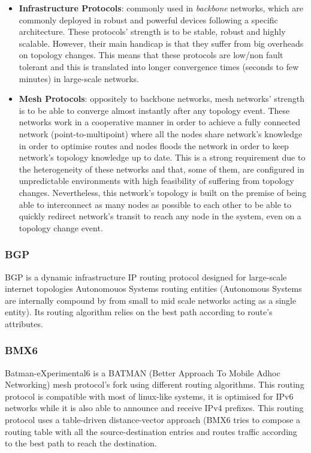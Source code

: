 \begin{itemize}
    \item \textbf{Infrastructure Protocols}: commonly used in \textit{backbone} networks, which are commonly deployed in robust and powerful devices following a specific architecture. These protocols' strength is to be stable, robust and highly scalable. However, their main handicap is that they suffer from big overheads on topology changes. This means that these protocols are low/non fault tolerant and this is translated into longer convergence times (seconds to few minutes) in large-scale networks.

    \item \textbf{Mesh Protocols}: oppositely to backbone networks, mesh networks' strength is to be able to converge almost instantly after any topology event. These networks work in a cooperative manner in order to achieve a fully connected network (point-to-multipoint) where all the nodes share network's knowledge in order to optimise routes and nodes floods the network in order to keep network's topology knowledge up to date. This is a strong requirement due to the heterogeneity of these networks and that, some of them, are configured in unpredictable environments with high feasibility of suffering from topology changes. Nevertheless, this network's topology is built on the premise of being able to interconnect as many nodes as possible to each other to be able to quickly redirect network's transit to reach any node in the system, even on a topology change event.
\end{itemize}

\subsubsection{BGP}
\label{subsubsec:bgp}
BGP is a dynamic infrastructure IP routing protocol designed for large-scale internet topologies Autonomouos Systems routing entities (Autonomous Systems are internally compound by from small to mid scale networks acting as a single entity). Its routing algorithm relies on the best path according to route's attributes.

\subsubsection{BMX6}
\label{subsec:bmx6}
Batman-eXperimental6 \cite{bmx6} is a BATMAN (Better Approach To Mobile Adhoc Networking) mesh protocol's fork using different routing algorithms. This routing protocol is compatible with most of linux-like systems, it is optimised for IPv6 networks while it is also able to announce and receive IPv4 prefixes. This routing protocol uses a table-driven distance-vector approach (BMX6 tries to compose a routing table with all the source-destination entries and routes traffic according to the best path to reach the destination.

